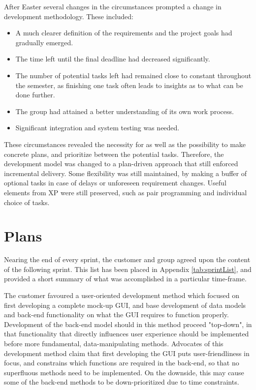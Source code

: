 After Easter several changes in the circumstances prompted a change in development methodology. These included:
\begin{itemize}
\item A much clearer definition of the requirements and the project goals had gradually emerged.
\item The time left until the final deadline had decreased significantly.
\item The number of potential tasks left had remained close to constant throughout the semester, as finishing one task often leads to insights as to what can be done further.
\item The group had attained a better understanding of its own work process. 
\item Significant integration and system testing was needed.
\end{itemize}
These circumstances revealed the necessity for as well as the possibility to make concrete plans, and prioritize between the potential tasks. Therefore,  the development model was changed to a plan-driven approach that still enforced incremental delivery. Some flexibility was still maintained, by making a buffer of optional tasks in case of delays or unforeseen requirement changes. Useful elements from XP were still preserved, such as pair programming and individual choice of tasks.


\section{Plans}	

Nearing the end of every sprint, the customer and group agreed upon the content of the following sprint. This list has been placed in Appendix \ref{tab:sprintList}, and provided a short summary of what was accomplished in a particular time-frame. 

The customer favoured a user-oriented development method which focused on first developing a complete mock-up GUI, and base development of data models and back-end functionality on what the GUI requires to function properly. Development of the back-end model should in this method proceed "top-down", in that functionality that directly influences user experience should be implemented before more fundamental, data-manipulating methods. Advocates of this development method claim that first developing the GUI puts user-friendliness in focus, and constrains which functions are required in the back-end, so that no superfluous methods need to be implemented. On the downside, this may cause some of the back-end methods to be down-prioritized due to time constraints.


